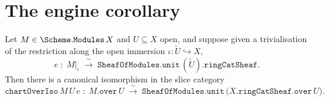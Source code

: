 \section{The engine corollary}
\label{sec:soe_chart}

\begin{lemma}\leanok
  \label{lem:chart_over_iso}
  Let \(M \in \Scheme.\mathtt{Modules}\,X\) and \(U \subseteq X\) open, and suppose
  given a trivialisation of the restriction along the open immersion
  \(\iota : \widetilde{U} \hookrightarrow X\),
  \[
    e \;:\; M|_\iota \;\xrightarrow{\ \sim\ }\;
      \mathtt{SheafOfModules.unit}\,(\widetilde{U}).\mathtt{ringCatSheaf}.
  \]
  Then there is a canonical isomorphism in the slice category
  \[
    \mathtt{chartOverIso}\,M\,U\,e \;:\;
      M.\mathtt{over}\,U \;\xrightarrow{\ \sim\ }\;
      \mathtt{SheafOfModules.unit}\,\bigl(X.\mathtt{ringCatSheaf}.\mathtt{over}\,U\bigr).
  \]
\end{lemma}

